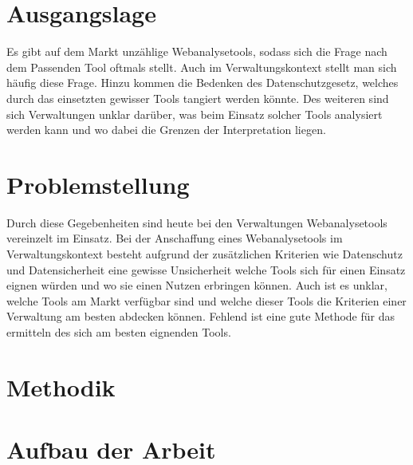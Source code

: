 
\section{Ausgangslage}
Es gibt auf dem Markt unzählige Webanalysetools, sodass sich die Frage nach dem Passenden Tool oftmals stellt. Auch im Verwaltungskontext stellt man sich häufig diese Frage. Hinzu kommen die Bedenken des Datenschutzgesetz, welches durch das einsetzten gewisser Tools tangiert werden könnte. Des weiteren sind sich Verwaltungen unklar darüber, was beim Einsatz solcher Tools analysiert werden kann und wo dabei die Grenzen der Interpretation liegen.

\section{Problemstellung}

Durch diese Gegebenheiten sind heute bei den Verwaltungen Webanalysetools vereinzelt im Einsatz. Bei der Anschaffung eines Webanalysetools im Verwaltungskontext besteht aufgrund der zusätzlichen Kriterien wie Datenschutz und Datensicherheit eine gewisse Unsicherheit welche Tools sich für einen Einsatz eignen würden und wo sie einen Nutzen erbringen können. Auch ist es unklar, welche Tools am Markt verfügbar sind und welche dieser Tools die Kriterien einer Verwaltung am besten abdecken können. Fehlend ist eine gute Methode für das ermitteln des sich am besten eignenden Tools.

\section{Methodik}


\section{Aufbau der Arbeit}

